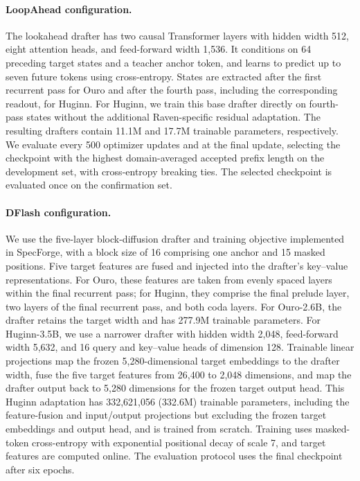 \paragraph{LoopAhead configuration.}
The lookahead drafter has two causal Transformer layers with hidden
width 512, eight attention heads, and feed-forward width 1,536.
It conditions on 64 preceding target states and a teacher anchor token,
and learns to predict up to seven future tokens using cross-entropy.
States are extracted after the first recurrent pass for Ouro and after
the fourth pass, including the corresponding readout, for Huginn.
For Huginn, we train this base drafter directly on fourth-pass states
without the additional Raven-specific residual adaptation.
The resulting drafters contain 11.1M and 17.7M trainable parameters,
respectively.
We evaluate every 500 optimizer updates and at the final update,
selecting the checkpoint with the highest domain-averaged accepted
prefix length on the development set, with cross-entropy breaking ties.
The selected checkpoint is evaluated once on the confirmation set.

\paragraph{DFlash configuration.}
We use the five-layer block-diffusion drafter and training objective
implemented in SpecForge, with a block size of 16 comprising one anchor
and 15 masked positions. Five target features are fused and injected
into the drafter's key--value representations.
For Ouro, these features are taken from evenly spaced layers within
the final recurrent pass; for Huginn, they comprise the final prelude
layer, two layers of the final recurrent pass, and both coda layers.
For Ouro-2.6B, the drafter retains the target width and has 277.9M
trainable parameters. For Huginn-3.5B, we use a narrower drafter with
hidden width 2,048, feed-forward width 5,632, and 16 query and key--value
heads of dimension 128. Trainable linear projections map the frozen
5,280-dimensional target embeddings to the drafter width, fuse the five
target features from 26,400 to 2,048 dimensions, and map the drafter
output back to 5,280 dimensions for the frozen target output head.
This Huginn adaptation has 332,621,056 (332.6M) trainable parameters,
including the feature-fusion and input/output projections but excluding
the frozen target embeddings and output head, and is trained from scratch.
Training uses masked-token cross-entropy with exponential positional
decay of scale 7, and target features are computed online.
The evaluation protocol uses the final checkpoint after six epochs.

